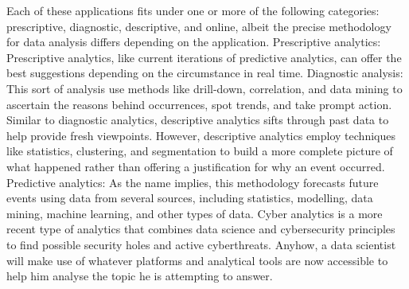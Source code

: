 \documentclass[journal]{IEEEtran}
\begin{document}
\par Each of these applications fits under one or more of the following categories: prescriptive, diagnostic, descriptive, and online, albeit the precise methodology for data analysis differs depending on the application. Prescriptive analytics: Prescriptive analytics, like current iterations of predictive analytics, can offer the best suggestions depending on the circumstance in real time. Diagnostic analysis: This sort of analysis use methods like drill-down, correlation, and data mining to ascertain the reasons behind occurrences, spot trends, and take prompt action. Similar to diagnostic analytics, descriptive analytics sifts through past data to help provide fresh viewpoints. However, descriptive analytics employ techniques like statistics, clustering, and segmentation to build a more complete picture of what happened rather than offering a justification for why an event occurred. Predictive analytics: As the name implies, this methodology forecasts future events using data from several sources, including statistics, modelling, data mining, machine learning, and other types of data. Cyber analytics is a more recent type of analytics that combines data science and cybersecurity principles to find possible security holes and active cyberthreats. Anyhow, a data scientist will make use of whatever platforms and analytical tools are now accessible to help him analyse the topic he is attempting to answer.
\end{document}

